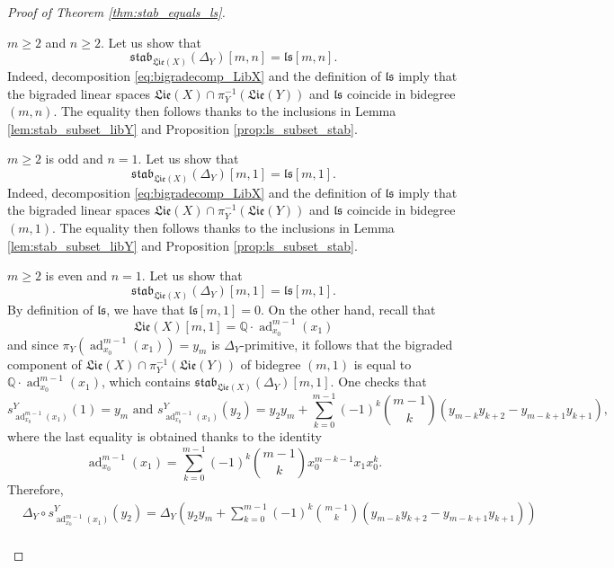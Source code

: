 \documentclass[11pt, a4paper]{amsart}
\numberwithin{equation}{section}
\theoremstyle{definition}
\newcommand{\Q}{\mathbb{Q}}
\newcommand{\ad}{\operatorname{ad}}
\newcommand{\Lie}{\mathfrak{Lie}}
\newcommand{\stab}{\mathfrak{stab}}
\begin{document}
\begin{proof}[Proof of Theorem \ref{thm:stab_equals_ls}]
\begin{caselist}
        \item $m \geq 2$ and $n \geq 2$. Let us show that
        \[
            \stab_{\Lie(X)}(\Delta_Y)[m, n] = \mathfrak{ls}[m, n].
        \]
        Indeed, decomposition \eqref{eq:bigradecomp_LibX} and the definition of %
        $\mathfrak{ls}$ imply that the bigraded linear spaces $\Lie(X) \cap \pi_Y^{-1}(\Lie(Y))$ and $\mathfrak{ls}$ coincide in bidegree $(m,n)$.
        The equality then follows thanks to the inclusions in Lemma \ref{lem:stab_subset_libY} and Proposition \ref{prop:ls_subset_stab}.
        \item $m \geq 2$ is odd and $n = 1$. Let us show that
        \[
            \stab_{\Lie(X)}(\Delta_Y)[m, 1] = \mathfrak{ls}[m, 1].
        \]
        Indeed, decomposition \eqref{eq:bigradecomp_LibX} and the definition of %
        $\mathfrak{ls}$ imply that the bigraded linear spaces $\Lie(X) \cap \pi_Y^{-1}(\Lie(Y))$ and $\mathfrak{ls}$ coincide in bidegree $(m,1)$.
        The equality then follows thanks to the inclusions in Lemma \ref{lem:stab_subset_libY} and Proposition \ref{prop:ls_subset_stab}.
        \item $m \geq 2$ is even and $n = 1$. Let us show that
        \[
            \stab_{\Lie(X)}(\Delta_Y)[m, 1] = \mathfrak{ls}[m, 1].
        \]
        By definition of $\mathfrak{ls}$, we have that $\mathfrak{ls}[m, 1]=0$. On the other hand, recall that
        \[
            \Lie(X)[m,1] = \Q \cdot \ad_{x_0}^{m-1}(x_1)
        \]
        and since $\pi_Y(\ad_{x_0}^{m-1}(x_1)) = y_m$ is $\Delta_Y$-primitive, it follows that the bigraded component of $\Lie(X) \cap \pi_Y^{-1}(\Lie(Y))$ of bidegree $(m,1)$ is equal to $\Q \cdot \ad_{x_0}^{m-1}(x_1)$, which contains $\stab_{\Lie(X)}(\Delta_Y)[m,1]$. One checks that
        \[
            s_{\ad_{x_0}^{m-1}(x_1)}^Y(1) = y_m \text{ and } s_{\ad_{x_0}^{m-1}(x_1)}^Y(y_2) = y_2 y_m + \sum_{k=0}^{m-1} (-1)^k \binom{m-1}{k} (y_{m-k} y_{k+2} - y_{m-k+1} y_{k+1}),
        \]
        where the last equality is obtained thanks to the identity
        \[
            \ad_{x_0}^{m-1}(x_1) = \sum_{k=0}^{m-1} (-1)^k \binom{m-1}{k} x_0^{m-k-1} x_1 x_0^k.
        \]
        Therefore,
        \begin{align}
            & \Delta_Y \circ s_{\ad_{x_0}^{m-1}(x_1)}^Y(y_2) = \Delta_Y\left(y_2 y_m + \sum_{k=0}^{m-1} (-1)^k \binom{m-1}{k} (y_{m-k} y_{k+2} - y_{m-k+1} y_{k+1})\right) \label{DeltaYsYy2} \\

\end{align}
\end{caselist}
\end{proof}
\end{document}
